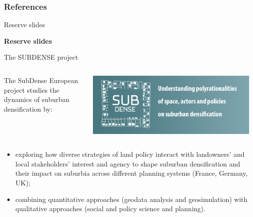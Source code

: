 \documentclass{beamer}
\begin{document}
\begin{frame}[allowframebreaks]
\frametitle{References}


\end{frame}



\begin{frame}{Reserve slides}

\vfill

\begin{center}
{\Huge\bf Reserve slides}
\end{center}

\vfill

\end{frame}



\begin{frame}{The SUBDENSE project}


\begin{columns}
	\begin{column}{0.6\textwidth}
		The SubDense European project studies the dynamics of suburban densification by:
 
	\end{column}
	\begin{column}{0.4\textwidth}
		\includegraphics[height=0.2\textheight]{figures/subdense.png}
	\end{column}
\end{columns}


\begin{itemize} 
	\item exploring how diverse strategies of land policy interact with landowners’ and local stakeholders’ interest and agency to shape suburban densification and their impact on suburbia across different planning systems (France, Germany, UK);
	\item combining quantitative approaches (geodata analysis and geosimulation) with qualitative approaches (social and policy science and planning).
\end{itemize}



\end{frame}
\end{document}
